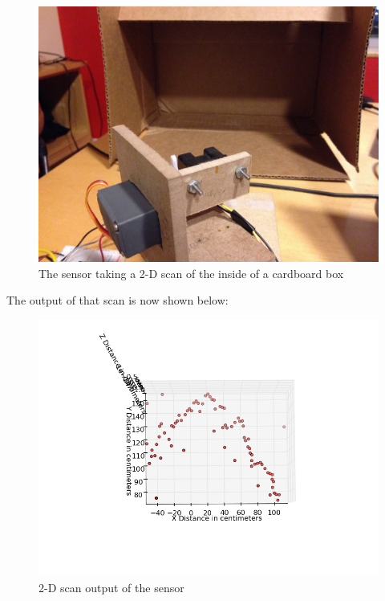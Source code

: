 \documentclass{article}
\begin{document}
\begin{figure}[h!]
\begin{center}
\includegraphics[scale=0.08]{2dscanpic.JPG}
\caption{The sensor taking a 2-D scan of the inside of a cardboard box}
\end{center}
\end{figure}
\newpage

The output of that scan is now shown below:

\begin{figure}[h!]
\begin{center}
\includegraphics[scale=0.6]{2d_scan.png}
\caption{2-D scan output of the sensor}
\end{center}
\end{figure}
\end{document}
